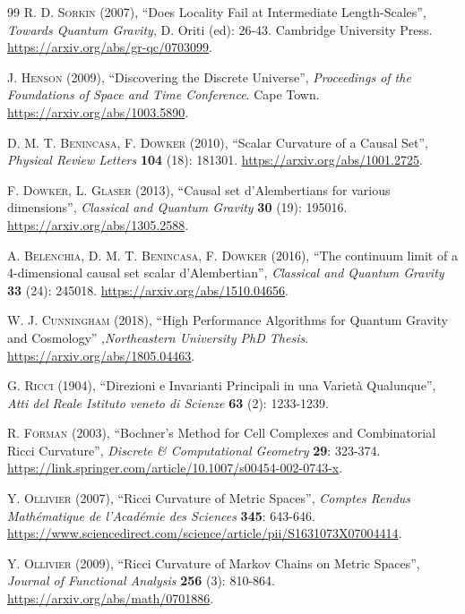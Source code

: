 \documentclass{article}
\begin{document}
\begin{thebibliography}{99}
\textsc{R. D. Sorkin} (2007), ``Does Locality Fail at Intermediate Length-Scales'', \textit{Towards Quantum Gravity}, D. Oriti (ed): 26-43. Cambridge University Press. \url{https://arxiv.org/abs/gr-qc/0703099}.

\textsc{J. Henson} (2009), ``Discovering the Discrete Universe'', \textit{Proceedings of the Foundations of Space and Time Conference}. Cape Town. \url{https://arxiv.org/abs/1003.5890}.

\textsc{D. M. T. Benincasa, F. Dowker} (2010), ``Scalar Curvature of a Causal Set'', \textit{Physical Review Letters} \textbf{104} (18): 181301. \url{https://arxiv.org/abs/1001.2725}.

\textsc{F. Dowker, L. Glaser} (2013), ``Causal set d'Alembertians for various dimensions'', \textit{Classical and Quantum Gravity} \textbf{30} (19): 195016. \url{https://arxiv.org/abs/1305.2588}.

\textsc{A. Belenchia, D. M. T. Benincasa, F. Dowker} (2016), ``The continuum limit of a 4-dimensional causal set scalar d'Alembertian'', \textit{Classical and Quantum Gravity} \textbf{33} (24): 245018. \url{https://arxiv.org/abs/1510.04656}.

\textsc{W. J. Cunningham} (2018), ``High Performance Algorithms for Quantum Gravity and Cosmology'' ,\textit{Northeastern University PhD Thesis}. \url{https://arxiv.org/abs/1805.04463}.

\textsc{G. Ricci} (1904), ``Direzioni e Invarianti Principali in una Variet\`a Qualunque'', \textit{Atti del Reale Istituto veneto di Scienze} \textbf{63} (2): 1233-1239.

\textsc{R. Forman} (2003), ``Bochner's Method for Cell Complexes and Combinatorial Ricci Curvature'', \textit{Discrete \& Computational Geometry} \textbf{29}: 323-374. \url{https://link.springer.com/article/10.1007/s00454-002-0743-x}.

\textsc{Y. Ollivier} (2007), ``Ricci Curvature of Metric Spaces'', \textit{Comptes Rendus Math\'ematique de l'Acad\'emie des Sciences} \textbf{345}: 643-646. \url{https://www.sciencedirect.com/science/article/pii/S1631073X07004414}.

\textsc{Y. Ollivier} (2009), ``Ricci Curvature of Markov Chains on Metric Spaces'', \textit{Journal of Functional Analysis} \textbf{256} (3): 810-864. \url{https://arxiv.org/abs/math/0701886}.


\end{thebibliography}
\end{document}
